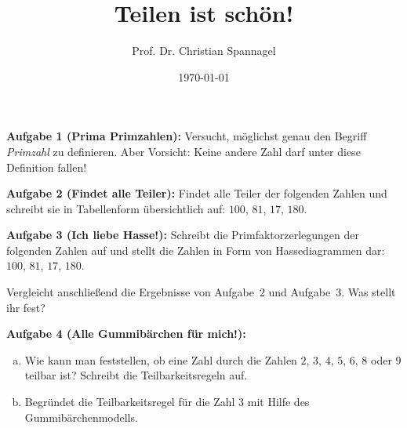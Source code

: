 \documentclass{../cssheet}
\title{Teilen ist schön!}
\author{Prof. Dr. Christian Spannagel}
\date{\today}
\begin{document}
\printtitle

\vspace*{10mm}

\textbf{Aufgabe 1 (Prima Primzahlen):}  Versucht, möglichst genau den Begriff \emph{Primzahl} zu definieren. Aber Vorsicht: Keine andere Zahl darf unter diese Definition fallen!

\textbf{Aufgabe 2 (Findet alle Teiler):}  Findet alle Teiler der folgenden Zahlen und schreibt sie in Tabellenform übersichtlich auf: $100$, $81$, $17$, $180$.

\textbf{Aufgabe 3 (Ich liebe Hasse!):}  Schreibt die Primfaktorzerlegungen der folgenden Zahlen auf und stellt die Zahlen in Form von Hassediagrammen dar: $100$, $81$, $17$, $180$. 

Vergleicht anschließend die Ergebnisse von Aufgabe~2 und Aufgabe~3. Was stellt ihr fest?

\textbf{Aufgabe 4 (Alle Gummibärchen für mich!):}  
\begin{enumerate}[a)]
\item Wie kann man feststellen, ob eine Zahl durch die Zahlen $2$, $3$, $4$, $5$, $6$, $8$ oder $9$ teilbar ist? Schreibt die Teilbarkeitsregeln auf.  
\item Begründet die Teilbarkeitsregel für die Zahl $3$ mit Hilfe des Gummibärchenmodells.
\end{enumerate}


\vspace*{10mm}
\printlicense

\printsocials
\end{document}
